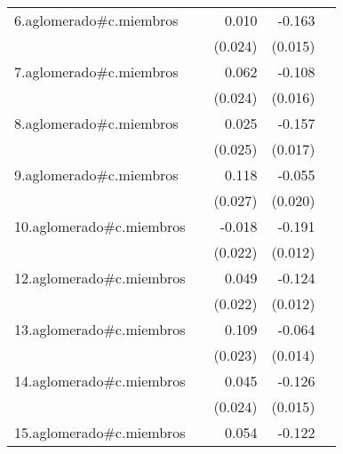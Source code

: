 {\begin{longtable}{l*{4}{D{.}{.}{-1}}}
\addlinespace
6.aglomerado#c.miembros&                     &       0.010         &      -0.163\sym{***}&                     \\
            &                     &     (0.024)         &     (0.015)         &                     \\
\addlinespace
7.aglomerado#c.miembros&                     &       0.062\sym{*}  &      -0.108\sym{***}&                     \\
            &                     &     (0.024)         &     (0.016)         &                     \\
\addlinespace
8.aglomerado#c.miembros&                     &       0.025         &      -0.157\sym{***}&                     \\
            &                     &     (0.025)         &     (0.017)         &                     \\
\addlinespace
9.aglomerado#c.miembros&                     &       0.118\sym{***}&      -0.055\sym{**} &                     \\
            &                     &     (0.027)         &     (0.020)         &                     \\
\addlinespace
10.aglomerado#c.miembros&                     &      -0.018         &      -0.191\sym{***}&                     \\
            &                     &     (0.022)         &     (0.012)         &                     \\
\addlinespace
12.aglomerado#c.miembros&                     &       0.049\sym{*}  &      -0.124\sym{***}&                     \\
            &                     &     (0.022)         &     (0.012)         &                     \\
\addlinespace
13.aglomerado#c.miembros&                     &       0.109\sym{***}&      -0.064\sym{***}&                     \\
            &                     &     (0.023)         &     (0.014)         &                     \\
\addlinespace
14.aglomerado#c.miembros&                     &       0.045         &      -0.126\sym{***}&                     \\
            &                     &     (0.024)         &     (0.015)         &                     \\
\addlinespace
15.aglomerado#c.miembros&                     &       0.054\sym{*}  &      -0.122\sym{***}&                     \\

\end{longtable}}
